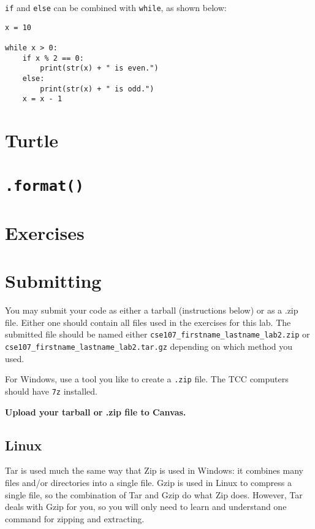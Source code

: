 \documentclass[12pt,hidelinks]{article}
\begin{document}
\texttt{if} and \texttt{else} can be combined with \texttt{while}, as shown below:

\begin{lstlisting}[style=python]
x = 10

while x > 0:
    if x % 2 == 0:
        print(str(x) + " is even.")
    else:
        print(str(x) + " is odd.")
    x = x - 1
\end{lstlisting}


\section{Turtle}


\section{\texttt{.format()}}

\pagebreak
\section{Exercises}

\pagebreak
\section{Submitting}

You may submit your code as either a tarball (instructions below) or as a .zip
file. Either one should contain all files used in the exercises for this lab.
The submitted file should be named either
\texttt{cse107\_firstname\_lastname\_lab2.zip} or
\texttt{cse107\_firstname\_lastname\_lab2.tar.gz} depending on which method you
used.

For Windows, use a tool you like to create a \texttt{.zip} file. The TCC computers should
have \texttt{7z} installed.

\begin{center}
  \textbf{Upload your tarball or .zip file to Canvas.}
\end{center}

\subsection{Linux}

Tar is used much the same way that Zip is used in Windows: it combines many files and/or directories into a single file. Gzip is used in Linux to compress a single file, so the combination of Tar and Gzip do what Zip does. However, Tar deals with Gzip for you, so you will only need to learn and understand one command for zipping and extracting.
\end{document}
